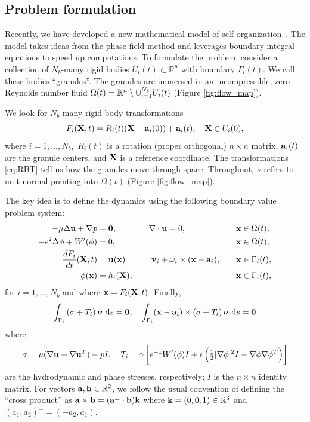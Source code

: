 \subsection{Problem formulation}
Recently, we have developed a new mathematical model of
self-organization~\cite{FuQuRyYo22,fu-ryh-qua-you2022,Fu2018_SIAM}. The
model takes ideas from the phase field method and leverages boundary
integral equations to speed up computations. To formulate the problem,
consider a collection of $N_b$-many rigid bodies $U_i(t) \subset \mathbb{R}^n$
with boundary $\Gamma_i(t)$.
We call these bodies ``granules''.
The granules are immersed 
in an incompressible, zero-Reynolds number fluid
$\Omega(t) = \RR^n \setminus \cup_{i=1}^{N_b} U_i(t)$
(Figure \ref{fig:flow_map}).

We look for $N_b$-many rigid body transformations
\begin{equation}
\label{eq:RBT}
F_i(\XX,t) = R_i(t)(\XX - \aa_i(0)) + \aa_i(t),\quad \XX \in U_i(0),
\end{equation}
where $i = 1,\ldots,N_b,$
$R_i(t)$ is a rotation (proper orthogonal) $n \times n$ matrix,
$\aa_i(t)$ are the granule centers, and $\XX$ is a reference coordinate.
The transformations \eqref{eq:RBT} tell us how the granules move through space.
Throughout, $\nu$ refers to unit normal pointing into $\Omega(t)$ (Figure \ref{fig:flow_map}).

The key idea is to define the dynamics using the following
boundary value problem system:
\begin{alignat}{4}
  -\mu\Delta \uu + \nabla p &= \mathbf{0}, 
  &&\quad \nabla \cdot \uu = 0, && \quad \xx \in \Omega(t), \label {eqn:stokes} \\
  \label{eqn:phase}
  -\epsilon^2 \Delta \phi + W'(\phi) &= 0, && &&\quad \xx \in \Omega(t),\\
\label{eqn:noslip}        
\frac{dF_i}{dt}(\XX,t) & = \uu(\xx) 
&&=\vv_i + \omega_i \times (\xx - \aa_i), 
&&\quad \xx \in \Gamma_i(t),\\
\label{eqn:material}
\phi(\xx) &= h_i(\XX), &&  &&\quad \xx \in \Gamma_i(t),
\end{alignat}
for $i=1,\ldots,N_b$
and where $\xx = F_i(\XX,t)$.
Finally,
\begin{equation}
\label{eqn:stressbalance}
\int_{\Gamma_i} \left(\sigma  + T_i\right)\nnu \,\dif s = \mathbf{0},\quad
\int_{\Gamma_i} (\xx - \aa_i)\times \left(\sigma + T_i\right) \nnu \,\dif s = \mathbf{0}
\end{equation}
where
\begin{equation}
\label{eqn:hydro_stress}
\sigma = \mu(\nabla \uu + \nabla \uu^T) - pI,\quad 
T_i = \gamma\left[\epsilon^{-1} W'(\phi)I
  + \epsilon\left(\tfrac{1}{2}|\nabla \phi|^2I - \nabla \phi \nabla
  \phi^T\right)\right]
\end{equation}
are the hydrodynamic and phase stresses, respectively; 
$I$ is the $n\times n$ identity matrix.
For vectors $\aa, \bb \in \mathbb{R}^2$,
we follow the usual convention of defining
the ``cross product'' as
$\aa \times \bb = (\aa^{\perp} \cdot \bb) \kk$
where $\kk = (0,0,1) \in \mathbb{R}^3$ and $(a_1,a_2)^{\perp} = (-a_2,a_1)$.

